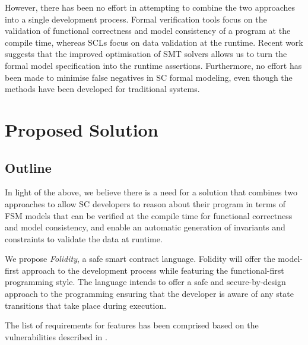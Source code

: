 \documentclass[oneside]{ecsproject}     %
\begin{document}
However, there has been no effort in attempting to combine the two approaches into a single development process. Formal verification tools
focus on the validation of functional correctness and model consistency of a program at the compile time, whereas SCLs focus on data validation 
at the runtime. Recent work suggests that the improved optimisation of SMT solvers allows us to turn the formal model specification into 
the runtime assertions\cite{runtime_assert}. Furthermore, no effort has been made to minimise false negatives in SC formal modeling, 
even though the methods have been developed for traditional systems\cite{event_b}.


\chapter{Proposed Solution} \label{Chapter:Solution}

\section{Outline}

In light of the above, we believe there is a need for a solution that combines two approaches to allow SC developers to reason
about their program in terms of FSM models that can be verified at the compile time for functional correctness and model consistency,
and enable an automatic generation of invariants and constraints to validate the data at runtime.

We propose \textit{Folidity}, a safe smart contract language. Folidity will offer the model-first approach to the development process
while featuring the functional-first programming style. The language intends to offer a safe and secure-by-design approach to the programming
ensuring that the developer is aware of any state transitions that take place during execution.

The list of requirements for features has been comprised based on the vulnerabilities described in .
\end{document}
